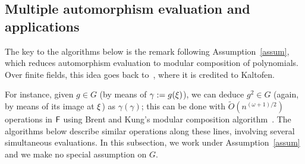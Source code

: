 
\subsection{Multiple automorphism evaluation and applications}

The key to the algorithms below is the remark following
Assumption~\ref{assum}, which reduces automorphism evaluation to
modular composition of polynomials.  Over finite fields, this idea
goes back to~\cite{GaSh92}, where it is credited to Kaltofen.

For instance, given $g \in G$ (by means of $\gamma:=g(\xi)$), we can
deduce $g^2 \in G$ (again, by means of its image at $\xi$) as
$\gamma(\gamma)$; this can be done with $\tilde{O}(n^{(\omega+1)/2})$
operations in ${\mathsf{F}}$ using Brent and Kung's modular composition
algorithm~\citep{BrKu78}. The algorithms below describe similar
operations along these lines, involving several simultaneous
evaluations. In this subsection, we work under Assumption~\ref{assum}
and we make no special assumption on $G$.

